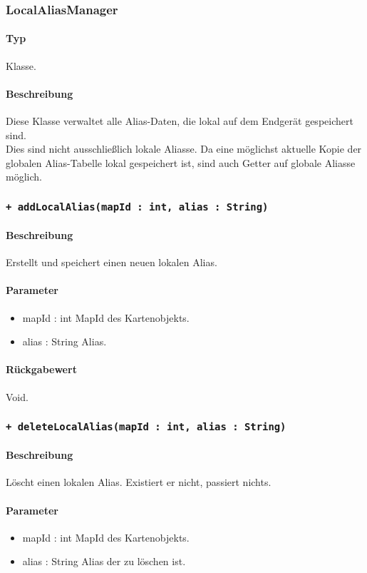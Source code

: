 \subsubsection{LocalAliasManager}
\paragraph*{Typ}
Klasse.
\paragraph*{Beschreibung}
Diese Klasse verwaltet alle Alias-Daten, die lokal auf dem Endgerät gespeichert sind.\\
Dies sind nicht ausschließlich lokale Aliasse. Da eine möglichst aktuelle Kopie der 
globalen Alias-Tabelle lokal gespeichert ist, sind auch Getter auf globale Aliasse möglich.

\subsubsection*{\texttt{+ addLocalAlias(mapId : int, alias : String)}}%
\paragraph*{Beschreibung}
Erstellt und speichert einen neuen lokalen Alias.
\paragraph*{Parameter}
\begin{itemize}
    \item mapId : int MapId des Kartenobjekts.
    \item alias : String Alias.
\end{itemize}
\paragraph*{Rückgabewert}
Void.

\subsubsection*{\texttt{+ deleteLocalAlias(mapId : int, alias : String)}}%
\paragraph*{Beschreibung}
Löscht einen lokalen Alias. Existiert er nicht, passiert nichts.
\paragraph*{Parameter}
\begin{itemize}
    \item mapId : int MapId des Kartenobjekts.
    \item alias : String Alias der zu löschen ist.
\end{itemize}
